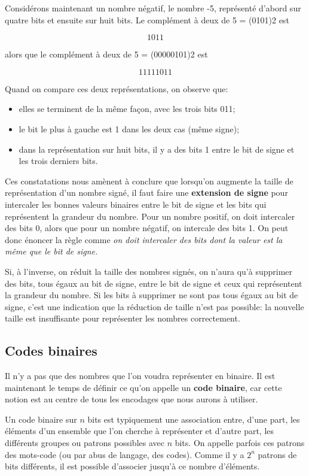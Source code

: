\documentclass[11pt]{article}
\begin{document}
Considérons maintenant un nombre négatif, le nombre -5, représenté
d'abord sur quatre bits et ensuite sur huit bits. Le complément à deux
de 5 = (0101)2 est

$$ 1011 $$

alors que le complément à deux de 5 = (00000101)2 est

$$ 11111011 $$

Quand on compare ces deux représentations, on observe que: 

\begin{itemize}
\item elles se terminent de la même façon, avec les trois bits 011;
\item le bit le plus à gauche est 1 dans les deux cas (même signe);
\item dans la représentation sur huit bits, il y a des bits 1 entre le bit
de signe et les trois derniers bits.
\end{itemize}

Ces constatations nous amènent à conclure que lorsqu'on augmente la
taille de représentation d'un nombre signé, il faut faire une
\textbf{extension de signe} pour intercaler les bonnes valeurs binaires entre
le bit de signe et les bits qui représentent la grandeur du
nombre. Pour un nombre positif, on doit intercaler des bits 0, alors
que pour un nombre négatif, on intercale des bits 1. On peut donc
énoncer la règle comme \emph{on doit intercaler des bits dont la valeur est
la même que le bit de signe.}

Si, à l'inverse, on réduit la taille des nombres signés, on n'aura
qu'à supprimer des bits, tous égaux au bit de signe, entre le bit de
signe et ceux qui représentent la grandeur du nombre. Si les bits à
supprimer ne sont pas tous égaux au bit de signe, c'est une indication
que la réduction de taille n'est pas possible: la nouvelle taille est
insuffisante pour représenter les nombres correctement.


\subsection{Codes binaires}
\label{sec:org47d528a}

Il n'y a pas que des nombres que l'on voudra représenter en
binaire. Il est maintenant le temps de définir ce qu'on appelle un
\textbf{code binaire}, car cette notion est au centre de tous les encodages
que nous aurons à utiliser.

Un code binaire sur \(n\) bits est typiquement une association entre,
d'une part, les éléments d'un ensemble que l'on cherche à représenter
et d’autre part, les différents groupes ou patrons possibles avec
\(n\) bits. On appelle parfois ces patrons des mots-code (ou par abus
de langage, des codes). Comme il y a \(2^n\) patrons de bits
différents, il est possible d'associer jusqu'à ce nombre
d'éléments.
\end{document}
